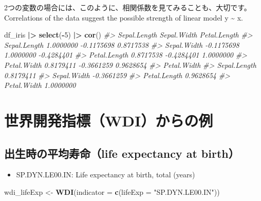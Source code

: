 \documentclass[
  xelatex, ja=standard]{bxjsbook}
\newenvironment{Shaded}{\begin{snugshade}}{\end{snugshade}}
\newcommand{\AttributeTok}[1]{\textcolor[rgb]{0.13,0.29,0.53}{#1}}
\newcommand{\CommentTok}[1]{\textcolor[rgb]{0.56,0.35,0.01}{\textit{#1}}}
\newcommand{\DecValTok}[1]{\textcolor[rgb]{0.00,0.00,0.81}{#1}}
\newcommand{\FunctionTok}[1]{\textcolor[rgb]{0.13,0.29,0.53}{\textbf{#1}}}
\newcommand{\NormalTok}[1]{#1}
\newcommand{\OtherTok}[1]{\textcolor[rgb]{0.56,0.35,0.01}{#1}}
\newcommand{\SpecialCharTok}[1]{\textcolor[rgb]{0.81,0.36,0.00}{\textbf{#1}}}
\newcommand{\StringTok}[1]{\textcolor[rgb]{0.31,0.60,0.02}{#1}}
\providecommand{\tightlist}{%
  \setlength{\itemsep}{0pt}\setlength{\parskip}{0pt}}
\theoremstyle{definition}
\theoremstyle{definition}
\theoremstyle{definition}
\theoremstyle{definition}
\theoremstyle{remark}
\begin{document}
2つの変数の場合には、このように、相関係数を見てみることも、大切です。Correlations of the data suggest the possible strength of linear model y \textasciitilde{} x.

\begin{Shaded}
\begin{Highlighting}[]
\NormalTok{df\_iris }\SpecialCharTok{|\textgreater{}} \FunctionTok{select}\NormalTok{(}\SpecialCharTok{{-}}\DecValTok{5}\NormalTok{) }\SpecialCharTok{|\textgreater{}} \FunctionTok{cor}\NormalTok{()}
\CommentTok{\#\textgreater{}              Sepal.Length Sepal.Width Petal.Length}
\CommentTok{\#\textgreater{} Sepal.Length    1.0000000  {-}0.1175698    0.8717538}
\CommentTok{\#\textgreater{} Sepal.Width    {-}0.1175698   1.0000000   {-}0.4284401}
\CommentTok{\#\textgreater{} Petal.Length    0.8717538  {-}0.4284401    1.0000000}
\CommentTok{\#\textgreater{} Petal.Width     0.8179411  {-}0.3661259    0.9628654}
\CommentTok{\#\textgreater{}              Petal.Width}
\CommentTok{\#\textgreater{} Sepal.Length   0.8179411}
\CommentTok{\#\textgreater{} Sepal.Width   {-}0.3661259}
\CommentTok{\#\textgreater{} Petal.Length   0.9628654}
\CommentTok{\#\textgreater{} Petal.Width    1.0000000}
\end{Highlighting}
\end{Shaded}

\hypertarget{ux4e16ux754cux958bux767aux6307ux6a19wdiux304bux3089ux306eux4f8b}{%
\section{世界開発指標（WDI）からの例}\label{ux4e16ux754cux958bux767aux6307ux6a19wdiux304bux3089ux306eux4f8b}}

\hypertarget{ux51faux751fux6642ux306eux5e73ux5747ux5bffux547dlife-expectancy-at-birth}{%
\subsection{出生時の平均寿命（life expectancy at birth）}\label{ux51faux751fux6642ux306eux5e73ux5747ux5bffux547dlife-expectancy-at-birth}}

\begin{itemize}
\tightlist
\item
  SP.DYN.LE00.IN: Life expectancy at birth, total (years)
\end{itemize}

\begin{Shaded}
\begin{Highlighting}[]
\NormalTok{wdi\_lifeExp }\OtherTok{\textless{}{-}} \FunctionTok{WDI}\NormalTok{(}\AttributeTok{indicator =} \FunctionTok{c}\NormalTok{(}\AttributeTok{lifeExp =} \StringTok{"SP.DYN.LE00.IN"}\NormalTok{))}
\end{Highlighting}
\end{Shaded}
\end{document}
